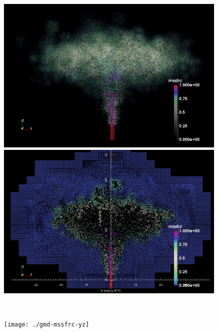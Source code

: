 \documentclass[gmd, manuscript]{copernicus} %
\providecommand{\DIFaddbegin}{} %
\providecommand{\DIFdelbegin}{} %
\providecommand{\DIFdelend}{} %
\begin{document}
\DIFdelbegin %
\DIFdelend \DIFaddbegin \begin{figure}[!htb]
    \centering
    \begin{minipage}{.45\textwidth}
        \centering
        \includegraphics[width=0.99 \textwidth]{./mssfrc-Diverging}
    \end{minipage}%
    \begin{minipage}{.45 \textwidth}
        \centering
        \includegraphics[width=0.99 \textwidth]{./mssfrc-Diverging-cut}
    \end{minipage}%
    \\
    \begin{minipage}{.45 \textwidth}
        \centering
        \texttt{[image: ./gmd-mssfrc-yz]}
    \end{minipage}%

\end{figure}
\end{document}
